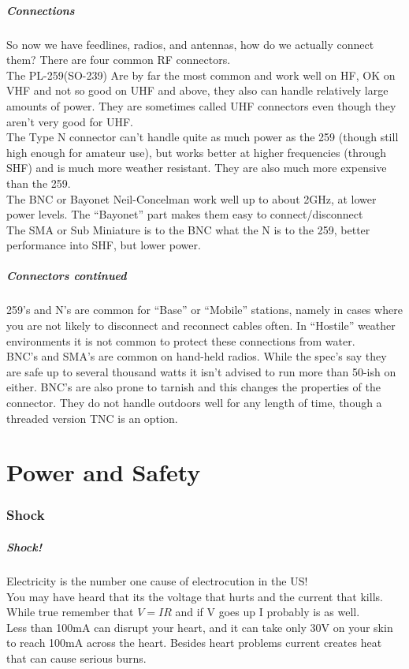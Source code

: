 \documentclass[10pt, handout]{beamer}
\begin{document}
\begin{frame}
\frametitle{Connections}
So now we have feedlines, radios, and antennas, how do we actually connect them? There are four common RF connectors.\pause\\
The PL-259(SO-239) Are by far the most common and work well on HF, OK on VHF and not so good on UHF and above, they also can handle relatively large amounts of power. They are sometimes called UHF connectors even though they aren't very good for UHF. \pause \\
The Type N connector can't handle quite as much power as the 259 (though still high enough for amateur use), but works better at higher frequencies (through SHF) and is much more weather resistant. They are also much more expensive than the 259. \pause \\
The BNC or Bayonet Neil-Concelman work well up to about 2GHz, at lower power levels. The ``Bayonet'' part makes them easy to connect/disconnect \pause \\
The SMA or Sub Miniature is to the BNC what the N is to the 259, better performance into SHF, but lower power.

\end{frame}

\begin{frame}
\frametitle{Connectors continued}
259's and N's are common for ``Base'' or ``Mobile'' stations, namely in cases where you are not likely to disconnect and reconnect cables often. In ``Hostile'' weather environments it is not common to protect these connections from water.\\
BNC's and SMA's are common on hand-held radios. While the spec's say they are safe up to several thousand watts it isn't advised to run more than 50-ish on either. BNC's are also prone to tarnish and this changes the properties of the connector. They do not handle outdoors well for any length of time, though a threaded version TNC is an option.
\end{frame}


\part{Power and Safety}

\section{Shock}

\begin{frame}
\frametitle{Shock!}
Electricity is the number one cause of electrocution in the US!\\
You may have heard that its the voltage that hurts and the current that kills. While true remember that $V=IR$ and if V goes up I probably is as well.\\
Less than 100mA can disrupt your heart, and it can take only 30V on your skin to reach 100mA across the heart.
Besides heart problems current creates heat that can cause serious burns.
\end{frame}
\end{document}
